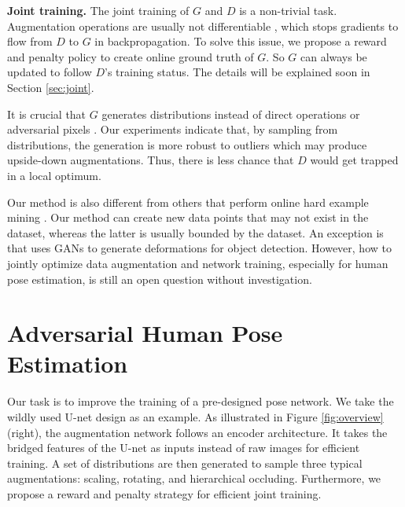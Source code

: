 \documentclass[10pt,twocolumn,letterpaper]{article}
\begin{document}
{\bf Joint training.} The joint training of $G$ and $D$ is a non-trivial task. Augmentation operations are usually not differentiable \cite{wang2017fast}, which stops gradients to flow from $D$ to $G$ in backpropagation. To solve this issue, we propose a reward and penalty policy to create online ground truth of $G$. So $G$ can always be updated to follow $D$'s training status. The details will be explained soon in Section \ref{sec:joint}.

It is crucial that $G$ generates distributions instead of direct operations \cite{wang2017fast} or adversarial pixels \cite{reed2016generative}. Our experiments indicate that, by sampling from distributions, the generation is more robust to outliers which may produce upside-down augmentations. Thus, there is less chance that $D$ would get trapped in a local optimum. %

Our method is also different from others that perform online hard example mining \cite{uijlings2013selective,shrivastava2016training}. Our method can create new data points that may not exist in the dataset, whereas the latter is usually bounded by the dataset. An exception is \cite{wang2017fast} that uses GANs to generate deformations for object detection. However, how to jointly optimize data augmentation and network training, especially for human pose estimation, is still an open question without investigation.

\section{Adversarial Human Pose Estimation}

Our task is to improve the training of a pre-designed pose network. We take the wildly used U-net design \cite{newell2016stacked,ronneberger2015unet} as an example. As illustrated in Figure \ref{fig:overview} (right), the augmentation network follows an encoder architecture. It takes the bridged features of the U-net as inputs instead of raw images for efficient training. A set of distributions are then generated to sample three typical augmentations: scaling, rotating, and hierarchical occluding. Furthermore, we propose a reward and penalty strategy for efficient joint training.
\end{document}
